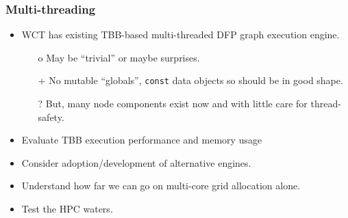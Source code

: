 \documentclass[xcolor=dvipsnames]{beamer}
\begin{document}
\begin{frame}
  \frametitle{Multi-threading}

  \begin{itemize}\footnotesize
  \item WCT has existing TBB-based multi-threaded DFP graph execution engine.
    \begin{itemize}\scriptsize
    \item[o] May be ``trivial'' or maybe surprises.
    \item[+] No mutable ``globals'', \texttt{const} data objects so should be in good shape.
    \item[?] But, many node components exist now and with little care for thread-safety.
    \end{itemize}
  \item Evaluate TBB execution performance and memory usage
  \item Consider adoption/development of alternative engines.
  \item Understand how far we can go on multi-core grid allocation alone.
  \item Test the HPC waters.
  \end{itemize}
  
\end{frame}
\end{document}
